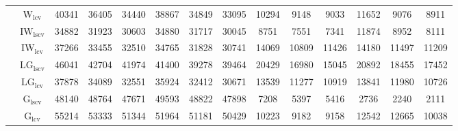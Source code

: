 \begin{table}[!ht]
{\begin{tabular}{@{}cc|ccc|ccc|ccc|ccc@{}}
 & $\mathrm{W}_{\mathrm{lcv}}$ & 40341 & 36405 & 34440 & 38867 & 34849 & 33095 & 10294 & 9148 & 9033 & 11652 & 9076 & 8911 \\ 
 & $\mathrm{IW}_{\mathrm{lscv}}$ & \cellcolor{black!30}34882 & \cellcolor{black!30}31923 & \cellcolor{black!30}30603 & \cellcolor{black!10}34880 & \cellcolor{black!30}31717 & \cellcolor{black!30}30045 & 8751 & 7551 & \cellcolor{black!10}7341 & 11874 & 8952 & 8111 \\ 
 & $\mathrm{IW}_{\mathrm{lcv}}$ & \cellcolor{black!10}37266 & \cellcolor{black!10}33455 & \cellcolor{black!10}32510 & \cellcolor{black!30}34765 & \cellcolor{black!10}31828 & 30741 & 14069 & 10809 & 11426 & 14180 & 11497 & 11209 \\ 
 & $\mathrm{LG}_{\mathrm{lscv}}$ & 46041 & 42704 & 41974 & 41400 & 39278 & 39464 & 20429 & 16980 & 15045 & 20892 & 18455 & 17452 \\ 
 & $\mathrm{LG}_{\mathrm{lcv}}$ & 37878 & 34089 & 32551 & 35924 & 32412 & \cellcolor{black!10}30671 & 13539 & 11277 & 10919 & 13841 & 11980 & 10726 \\ 
 & $\mathrm{G}_{\mathrm{lscv}}$ & 48140 & 48764 & 47671 & 49593 & 48822 & 47898 & \cellcolor{black!30}7208 & \cellcolor{black!30}5397 & \cellcolor{black!30}5416 & \cellcolor{black!30}2736 & \cellcolor{black!30}2240 & \cellcolor{black!30}2111 \\ 
 & $\mathrm{G}_{\mathrm{lcv}}$ & 55214 & 53333 & 51344 & 51964 & 51181 & 50429 & 10223 & 9182 & 9158 & 12542 & 12665 & 10038 \\ 
\bottomrule
\end{tabular}}
\end{table}
